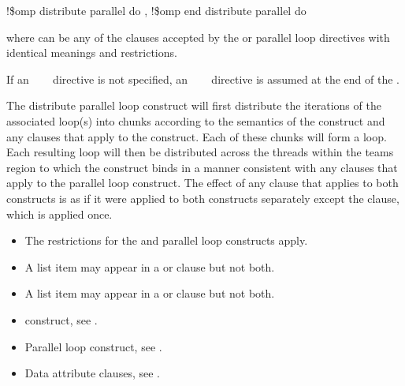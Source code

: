 \fortranspecificstart
\begin{boxedcode}
!\$omp distribute parallel do \plc{[clause[ [},\plc{] clause] ... ]}
\plc{[}!\$omp end distribute parallel do\plc{]}
\end{boxedcode}

where  can be any of the clauses accepted by the  or parallel loop 
directives with identical meanings and restrictions.

If an ~~~ directive is not specified, an 
~~~ directive is assumed at the end of the .
\fortranspecificend

\descr
The distribute parallel loop construct will first distribute the iterations of the associated loop(s) into chunks according to the semantics of the  construct and any clauses that apply to the  construct. Each of these chunks will form a loop. Each resulting loop will then be distributed across the threads within the teams region to which the  construct binds in a manner consistent with any clauses that apply to the parallel loop construct. 
The effect of any clause that applies to both constructs is as if it were applied to both constructs separately except the  clause, which is applied once.

\restrictions
\begin{itemize}
\item The restrictions for the  and parallel loop constructs apply.
\item A list item may appear in a  or  clause but not both.
\item A list item may appear in a  or  clause but not both.
\end{itemize}

\crossreferences
\begin{itemize}
\item {} construct, see 
.

\item Parallel loop construct, see 
.

\item Data attribute clauses, see 
.
\end{itemize}









